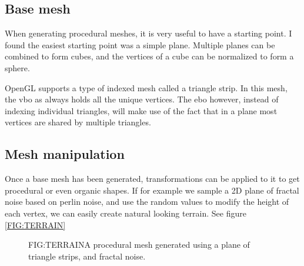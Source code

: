 
\label{SEC:PROCEDURAL}


\subsection{Base mesh}

When generating procedural meshes,
it is very useful to have a starting point.
I found the easiest starting point was a simple plane.
Multiple planes can be combined to form cubes,
and the vertices of a cube can be normalized to form a sphere.

OpenGL supports a type of indexed mesh called a triangle strip.
In this mesh,
the \ac{vbo} as always holds all the unique vertices.
The \ac{ebo} however,
instead of indexing individual triangles,
will make use of the fact that in a plane most vertices are shared by multiple triangles.

\subsection{Mesh manipulation}

Once a base mesh has been generated,
transformations can be applied to it to get procedural or even organic shapes.
If for example we sample a 2D plane of fractal noise based on perlin noise,
and use the random values to modify the height of each vertex,
we can easily create natural looking terrain.
See figure \ref{FIG:TERRAIN}

\begin{figure}[Procedural terrain mesh]{FIG:TERRAIN}{A procedural mesh generated using a plane of triangle strips, and fractal noise.}
\end{figure}



